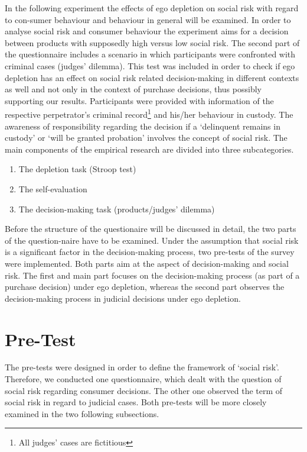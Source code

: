 In the following experiment the effects of ego depletion on social risk with regard to con-sumer behaviour and behaviour in general will be examined. In order to analyse social risk and consumer behaviour the experiment aims for a decision between products with supposedly high versus low social risk. The second part of the questionnaire includes a scenario in which participants were confronted with criminal cases (judges’ dilemma). This test was included in order to check if ego depletion has an effect on social risk related decision-making in different contexts as well and not only in the context of purchase decisions, thus possibly supporting our results. Participants were provided with information of the respective perpetrator’s criminal record\footnote{All judges’ cases are fictitious} and his/her behaviour in custody. The awareness of responsibility regarding the decision if a ‘delinquent remains in custody’ or ‘will be granted probation’ involves the concept of social risk.
The main components of the empirical research are divided into three subcategories. 
\begin{enumerate}
\item The depletion task (Stroop test)
\item The self-evaluation 
\item The decision-making task (products/judges’ dilemma)
\end{enumerate}
Before the structure of the questionaire will be discussed in detail, the two parts of the question-naire have to be examined. Under the assumption that social risk is a significant factor in the decision-making process, two pre-tests of the survey were implemented. Both parts aim at the aspect of decision-making and social risk. The first and main part focuses on the decision-making process (as part of a purchase decision) under ego depletion, whereas the second part observes the decision-making process in judicial decisions under ego depletion. 
\section{Pre-Test}
The pre-tests were designed in order to define the framework of ‘social risk’. Therefore, we conducted one questionnaire, which dealt with the question of social risk regarding consumer decisions. The other one observed the term of social risk in regard to judicial cases. Both pre-tests will be more closely examined in the two following subsections.
